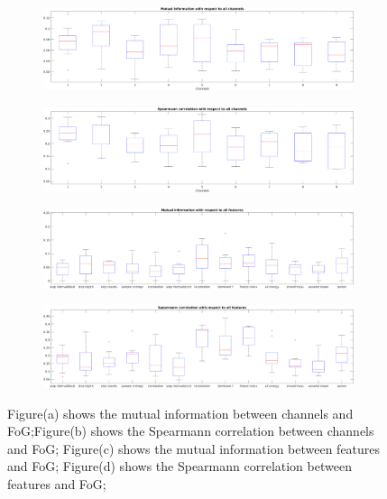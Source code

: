 \documentclass[article]{article}
\begin{document}
    
   	\begin{figure}
    	
    	\begin{subfigure}[b]{0.47\textwidth}
    		\centering
    		\includegraphics[width=\textwidth]{MutualA}
    		\caption{}
    		\label{fig:y equals x}
    	\end{subfigure}
		\hfill
    	\begin{subfigure}[b]{0.47\textwidth}
		\centering
		\includegraphics[width=\textwidth]{spearmannA}
		\caption{}
		\label{fig:y equals x}
		\end{subfigure}
	
		\begin{subfigure}[b]{0.47\textwidth}
			\centering
			\includegraphics[width=\textwidth]{MutualF}
			\caption{}
			\label{fig:y equals x}
		\end{subfigure}
		\hfill
		\begin{subfigure}[b]{0.47\textwidth}
			\centering
			\includegraphics[width=\textwidth]{spearmannF}
			\caption{}
			\label{fig:y equals x}
		\end{subfigure}
    
    	\caption{Figure(a) shows the mutual information between channels and FoG;Figure(b) shows the Spearmann correlation between channels and FoG;
    	Figure(c) shows the mutual information between features and FoG;
		Figure(d) shows the Spearmann correlation between features and FoG;}
    	\label{fig:three graphs}
    \end{figure}
    
\end{document}
